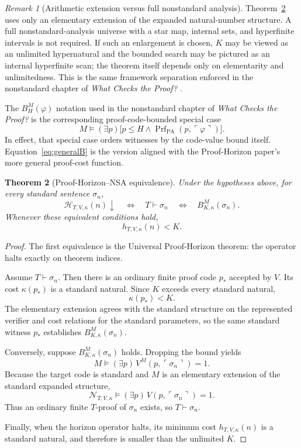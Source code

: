 \documentclass[11pt]{article}
\newtheorem{theorem}{Theorem}[section]
\theoremstyle{definition}
\theoremstyle{remark}
\newtheorem{remark}[theorem]{Remark}
\begin{document}
\begin{remark}[Arithmetic extension versus full nonstandard analysis]
Theorem~\ref{thm:horizonNSA} uses only an elementary extension of the expanded natural-number structure. A full nonstandard-analysis universe with a star map, internal sets, and hyperfinite intervals is not required. If such an enlargement is chosen, $K$ may be viewed as an unlimited hypernatural and the bounded search may be pictured as an internal hyperfinite scan; the theorem itself depends only on elementarity and unlimitedness. This is the same framework separation enforced in the nonstandard chapter of \emph{What Checks the Proof?} \cite{WCTP}.
\end{remark}

The $B_H^M(\varphi)$ notation used in the nonstandard chapter of \emph{What Checks the Proof?} is the corresponding proof-code-bounded special case
\[
M\models(\exists p)\bigl[p\le H\wedge
\operatorname{Prf}_{\mathrm{PA}}(p,\ulcorner\varphi\urcorner)\bigr].
\]
In effect, that special case orders witnesses by the code-value bound itself. Equation~\eqref{eq:generalB} is the version aligned with the Proof-Horizon paper's more general proof-cost function.

\begin{theorem}[Proof-Horizon--NSA equivalence]\label{thm:horizonNSA}
Under the hypotheses above, for every standard sentence $\sigma_n$,
\[
\boxed{
\mathcal H_{T,V,\kappa}(n)\downarrow
\quad\Longleftrightarrow\quad
T\vdash\sigma_n
\quad\Longleftrightarrow\quad
B^{M}_{K,\kappa}(\sigma_n).
}
\]
Whenever these equivalent conditions hold,
\[
h_{T,V,\kappa}(n)<K.
\]
\end{theorem}

\begin{proof}
The first equivalence is the Universal Proof-Horizon theorem: the operator halts exactly on theorem indices.

Assume $T\vdash\sigma_n$. Then there is an ordinary finite proof code $p_*$ accepted by $V$. Its cost $\kappa(p_*)$ is a standard natural. Since $K$ exceeds every standard natural,
\[
\kappa(p_*)<K.
\]
The elementary extension agrees with the standard structure on the represented verifier and cost relations for the standard parameters, so the same standard witness $p_*$ establishes $B^M_{K,\kappa}(\sigma_n)$.

Conversely, suppose $B^M_{K,\kappa}(\sigma_n)$ holds. Dropping the bound yields
\[
M\models(\exists p)\,V^M(p,\ulcorner\sigma_n\urcorner)=1.
\]
Because the target code is standard and $M$ is an elementary extension of the standard expanded structure,
\[
\mathcal N_{T,V,\kappa}\models(\exists p)\,V(p,\ulcorner\sigma_n\urcorner)=1.
\]
Thus an ordinary finite $T$-proof of $\sigma_n$ exists, so $T\vdash\sigma_n$.

Finally, when the horizon operator halts, its minimum cost $h_{T,V,\kappa}(n)$ is a standard natural, and therefore is smaller than the unlimited $K$.
\end{proof}
\end{document}
